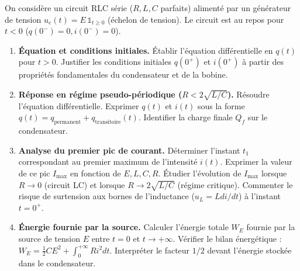 \documentclass[11pt]{article}
\begin{document}
\begin{exercice}
On considère un circuit RLC série ($R, L, C$ parfaits) alimenté par un générateur de tension $u_e(t) = E \, \mathbb{1}_{t \ge 0}$ (échelon de tension). Le circuit est au repos pour $t<0$ ($q(0^-)=0, i(0^-)=0$).

\begin{enumerate}
    \item \textbf{Équation et conditions initiales.} Établir l'équation différentielle en $q(t)$ pour $t>0$. Justifier les conditions initiales $q(0^+)$ et $i(0^+)$ à partir des propriétés fondamentales du condensateur et de la bobine.
    \item \textbf{Réponse en régime pseudo-périodique ($R < 2\sqrt{L/C}$).} Résoudre l'équation différentielle. Exprimer $q(t)$ et $i(t)$ sous la forme $q(t) = q_{\text{permanent}} + q_{\text{transitoire}}(t)$. Identifier la charge finale $Q_f$ sur le condensateur.
    \item \textbf{Analyse du premier pic de courant.} Déterminer l'instant $t_1$ correspondant au premier maximum de l'intensité $i(t)$. Exprimer la valeur de ce pic $I_{\text{max}}$ en fonction de $E, L, C, R$. Étudier l'évolution de $I_{\text{max}}$ lorsque $R \to 0$ (circuit LC) et lorsque $R \to 2\sqrt{L/C}$ (régime critique). Commenter le risque de surtension aux bornes de l'inductance ($u_L = L di/dt$) à l'instant $t=0^+$.
    \item \textbf{Énergie fournie par la source.} Calculer l'énergie totale $W_E$ fournie par la source de tension $E$ entre $t=0$ et $t \to +\infty$. Vérifier le bilan énergétique : $W_E = \frac{1}{2}C E^2 + \int_0^{+\infty} R i^2 dt$. Interpréter le facteur $1/2$ devant l'énergie stockée dans le condensateur.
\end{enumerate}
\end{exercice}
\end{document}
